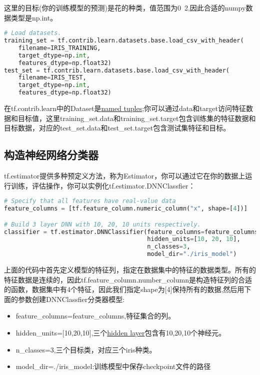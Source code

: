 这里的目标(你的训练模型的预测)是花的种类，值范围为0~2,因此合适的numpy数据类型是np.int。
\begin{lstlisting}[language=Python]
# Load datasets.
training_set = tf.contrib.learn.datasets.base.load_csv_with_header(
    filename=IRIS_TRAINING,
    target_dtype=np.int,
    features_dtype=np.float32)
test_set = tf.contrib.learn.datasets.base.load_csv_with_header(
    filename=IRIS_TEST,
    target_dtype=np.int,
    features_dtype=np.float32)
\end{lstlisting}
在tf.contrib.learn中的Dataset是\href{https://docs.python.org/2/library/collections.html#collections.namedtuple}{named tuples};你可以通过data和target访问特征数据和目标值，这里training\_set.data和training\_set.target包含训练集的特征数据和目标数据，对应的test\_set.data和test\_set.target包含测试集特征和目标。
\subsection{构造神经网络分类器}
tf.estimator提供多种预定义方法，称为Estimator，你可以通过它在你的数据上运行训练，评估操作，你可以实例化tf.estimator.DNNClassfier：
\begin{lstlisting}[language=Python]
# Specify that all features have real-value data
feature_columns = [tf.feature_column.numeric_column("x", shape=[4])]

# Build 3 layer DNN with 10, 20, 10 units respectively.
classifier = tf.estimator.DNNClassifier(feature_columns=feature_columns,
                                        hidden_units=[10, 20, 10],
                                        n_classes=3,
                                        model_dir="./iris_model")
\end{lstlisting}
上面的代码中首先定义模型的特征列，指定在数据集中的特征的数据类型。所有的特征数据是连续的，因此tf.feature\_column.number\_column是构造特征列的合适的函数，数据集中有4个特征，因此我们指定shape为[4]保持所有的数据,然后用下面的参数创建DNNClassfier分类器模型:
\begin{itemize}
    \item feature\_columns=feature\_columns,特征集合的列。
    \item hidden\_units=[10,20,10],三个\href{http://stats.stackexchange.com/questions/181/how-to-choose-the-number-of-hidden-layers-and-nodes-in-a-feedforward-neural-netw}{hidden layer}包含有10,20,10个神经元。
    \item n\_classes=3,三个目标类，对应三个iris种类。
    \item model\_dir=./iris\_model:训练模型中保存checkpoint文件的路径
\end{itemize}
